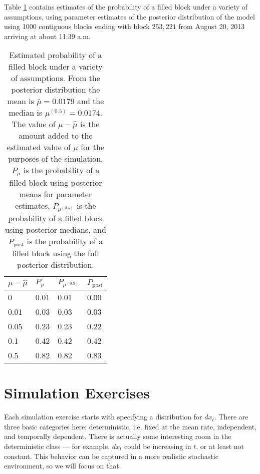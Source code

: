 \documentclass{article}
\begin{document}
Table \ref{tab:probsims} contains estimates of the probability of a filled block under a variety of assumptions, using parameter estimates of the posterior distribution of the model using 1000 contiguous blocks ending with block $253,221$ from August 20, 2013 arriving at about 11:39 a.m.
\begin{table}[ht]
\centering
\begin{tabular}{llll}
  \hline
$\mu - \hat{\mu}$ & $P_{\bar{\mu}}$ & $P_{\mu^{(0.5)}}$ & $P_{\mathrm{post}}$ \\ 
  \hline
0 & 0.01 & 0.01 & 0.00 \\ 
  0.01 & 0.03 & 0.03 & 0.03 \\ 
  0.05 & 0.23 & 0.23 & 0.22 \\ 
  0.1 & 0.42 & 0.42 & 0.42 \\ 
  0.5 & 0.82 & 0.82 & 0.83 \\ 
   \hline
\end{tabular}
\caption{Estimated probability of a filled block under a variety of assumptions. From the posterior distribution the mean is $\bar{\mu} = 0.0179$ and the median is $\mu^{(0.5)} = 0.0174$. The value of $\mu - \hat{\mu}$ is the amount added to the estimated value of $\mu$ for the purposes of the simulation, $P_{\bar{\mu}}$ is the probability of a filled block using posterior means for parameter estimates, $P_{\mu^{(0.5)}}$ is the probability of a filled block using posterior medians, and $P_{\mathrm{post}}$ is the probability of a filled block using the full posterior distribution.}
\label{tab:probsims}
\end{table}

\section{Simulation Exercises}

Each simulation exercise starts with specifying a distribution for $dx_t$. There are three basic categories here: deterministic, i.e. fixed at the mean rate, independent, and temporally dependent. There is actually some interesting room in the deterministic class --- for example, $dx_t$ could be increasing in $t$, or at least not constant. This behavior can be captured in a more realistic stochastic environment, so we will focus on that. 
\end{document}
